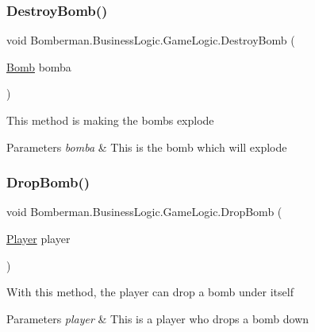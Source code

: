 \subsubsection{\texorpdfstring{DestroyBomb()}{DestroyBomb()}}
{\footnotesize\ttfamily void Bomberman.\+Business\+Logic.\+Game\+Logic.\+Destroy\+Bomb (\begin{DoxyParamCaption}\item[{\mbox{\hyperlink{class_bomberman_1_1_model_1_1_bomb}{Bomb}}}]{bomba }\end{DoxyParamCaption})\hspace{0.3cm}{\ttfamily [inline]}}



This method is making the bombs explode 


\begin{DoxyParams}{Parameters}
{\em bomba} & This is the bomb which will explode\\
\hline
\end{DoxyParams}
\mbox{\label{class_bomberman_1_1_business_logic_1_1_game_logic_a111f41e903e34bd84c7acd362fd0c562}} 
\subsubsection{\texorpdfstring{DropBomb()}{DropBomb()}}
{\footnotesize\ttfamily void Bomberman.\+Business\+Logic.\+Game\+Logic.\+Drop\+Bomb (\begin{DoxyParamCaption}\item[{\mbox{\hyperlink{class_bomberman_1_1_model_1_1_player}{Player}}}]{player }\end{DoxyParamCaption})\hspace{0.3cm}{\ttfamily [inline]}}



With this method, the player can drop a bomb under itself 


\begin{DoxyParams}{Parameters}
{\em player} & This is a player who drops a bomb down\\
\hline
\end{DoxyParams}
\mbox{\label{class_bomberman_1_1_business_logic_1_1_game_logic_a10cc00c77892547f704066daa8e3b211}} 
